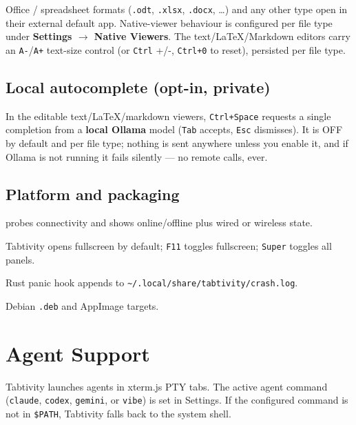 \documentclass[11pt,a4paper]{article}
\newcommand{\code}[1]{\texttt{#1}}
\begin{document}
Office / spreadsheet formats (\code{.odt}, \code{.xlsx}, \code{.docx}, \dots)
and any other type open in their external default app. Native-viewer behaviour
is configured per file type under \textbf{Settings $\rightarrow$ Native
Viewers}. The text/LaTeX/Markdown editors carry an \code{A-}/\code{A+}
text-size control (or \code{Ctrl} +/-, \code{Ctrl+0} to reset), persisted per
file type.

\subsection{Local autocomplete (opt-in, private)}

In the editable text/LaTeX/markdown viewers, \code{Ctrl+Space} requests a single
completion from a \textbf{local Ollama} model (\code{Tab} accepts, \code{Esc}
dismisses). It is OFF by default and per file type; nothing is sent anywhere
unless you enable it, and if Ollama is not running it fails silently --- no
remote calls, ever.

\subsection{Platform and packaging}

\begin{description}[leftmargin=1.2em,style=nextline]
  \item[Network indicator] probes connectivity and shows online/offline plus
  wired or wireless state.
  \item[Keyboard shortcuts] Tabtivity opens fullscreen by default; \code{F11}
  toggles fullscreen; \code{Super} toggles all panels.
  \item[Crash logging] Rust panic hook appends to
  \code{\textasciitilde/.local/share/tabtivity/crash.log}.
  \item[Packaging] Debian \code{.deb} and AppImage targets.
\end{description}

\section{Agent Support}

Tabtivity launches agents in xterm.js PTY tabs. The active agent command
(\code{claude}, \code{codex}, \code{gemini}, or \code{vibe}) is set in Settings.
If the configured command is not in \code{\$PATH}, Tabtivity falls back to the
system shell.
\end{document}
